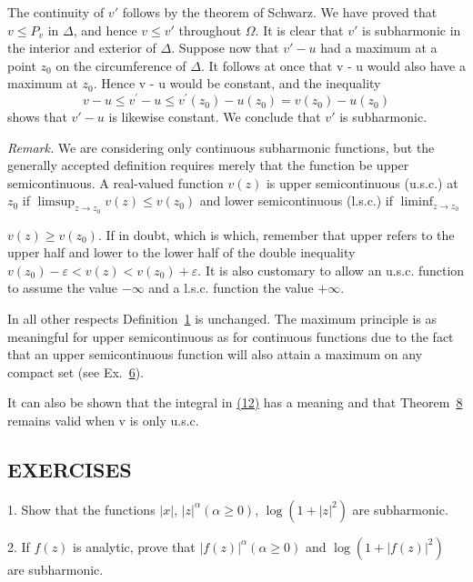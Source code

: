 The continuity of $v'$ follows by the theorem of Schwarz. We have proved that $v \leq P_{v}$ in $\Delta$, and hence $v \leq v'$ throughout $\Omega$. It is clear that $v'$ is subharmonic in the interior and exterior of $\Delta$. Suppose now that $v' - u$ had a maximum at a point $z_{0}$ on the circumference of $\Delta$. It follows at once that v - u would also have a maximum at $z_{0}$. Hence v - u would be constant, and the inequality
\begin{equation*}
v - u \leq v ^ {\prime} - u \leq v ^ {\prime} (z _ {0}) - u (z _ {0}) = v (z _ {0}) - u (z _ {0})
\end{equation*}
shows that $v' - u$ is likewise constant. We conclude that $v'$ is subharmonic.

\emph{Remark.} We are considering only continuous subharmonic functions, but the generally accepted definition requires merely that the function be upper semicontinuous. A real-valued function $v(z)$ is upper semicontinuous (u.s.c.) at $z_0$ if $\limsup_{z \to z_0} v(z) \leq v(z_0)$ and lower semicontinuous (l.s.c.) if $\liminf_{z \to z_0}$

$v(z) \geq v(z_{0})$. If in doubt, which is which, remember that upper refers to the upper half and lower to the lower half of the double inequality $v(z_{0}) - \varepsilon < v(z) < v(z_{0}) + \varepsilon$. It is also customary to allow an u.s.c. function to assume the value $-\infty$ and a l.s.c. function the value $+\infty$.

In all other respects Definition~\hyperref[def:6.1]{1} is unchanged. The maximum principle is as meaningful for upper semicontinuous as for continuous functions due to the fact that an upper semicontinuous function will also attain a maximum on any compact set (see Ex.~\hyperref[exercise:6.4.1.5.6]{6}).

It can also be shown that the integral in \hyperref[eq:6.12]{(12)} has a meaning and that Theorem~\hyperref[thm:6.8]{8} remains valid when v is only u.s.c.

\subsection*{EXERCISES}
1. Show that the functions $|x|$, $|z|^{\alpha}(\alpha \geq 0)$, $\log(1 + |z|^{2})$ are subharmonic.


2. If $f(z)$ is analytic, prove that $|f(z)|^{\alpha} (\alpha \geq 0)$ and $\log (1 + |f(z)|^{2})$ are subharmonic.

